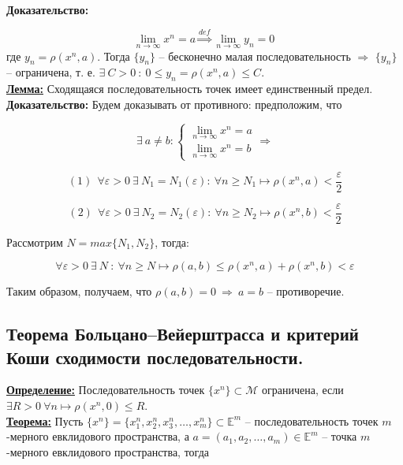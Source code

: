 \documentclass[a4paper,12pt]{article} %
\begin{document}
	\textbf{Доказательство:}
	
	\[ \lim\limits_{n \to \infty} x^n = a \stackrel{def}{\Rightarrow} \lim\limits_{n \to \infty} y_n = 0 \
	\]
	\noindent где $y_n = \rho(x^n, a)$. Тогда $\{y_n \}$ -- бесконечно малая последовательность $\Rightarrow$ $\{y_n \}$ -- ограничена, т. е. $\exists ~ C > 0 ~ : ~ 0 \leqslant y_n = \rho(x^n, a) \leqslant C$.\\
	
	\underline{\textbf{Лемма:}} Сходящаяся последовательность точек имеет единственный предел.\\
	
	\textbf{Доказательство:} Будем доказывать от противного: предположим, что
	
	\begin{equation*}
		\exists ~ a \neq b : 
		\begin{cases}
			\lim\limits_{n \to \infty} x^n = a\\
			\lim\limits_{n \to \infty} x^n = b
		\end{cases}
		\Rightarrow
	\end{equation*}
	
	\[ (1) ~~ \forall \varepsilon > 0 ~ \exists ~ N_1 = N_1(\varepsilon) : ~ \forall n \geqslant N_1 \mapsto \rho(x^n, a) < \frac{\varepsilon}{2} \]
	
	\[ (2) ~~ \forall \varepsilon > 0 ~ \exists ~ N_2 = N_2(\varepsilon) : ~ \forall n \geqslant N_2 \mapsto \rho(x^n, b) < \frac{\varepsilon}{2} \]
	
	Рассмотрим $N = max \{N_1, N_2\}$, тогда:
	
	\[ \forall \varepsilon > 0 ~ \exists ~ N ~ : ~ \forall n \geqslant N \mapsto \rho(a, b) \leqslant \rho(x^n, a) + \rho(x^n, b) < \varepsilon \]
	
	Таким образом, получаем, что $\rho(a, b) = 0 ~ \Rightarrow ~ a = b$ -- противоречие.\\
	
	\subsection{Теорема Больцано–Вейерштрасса и критерий Коши сходимости последовательности.}
	
	\underline{\textbf{Определение:}} Последовательность точек $\{x^n \} \subset \mathscr{M}$ ограничена, если $\exists R > 0 ~ \forall n \mapsto \rho(x^n, 0) \leqslant R$.\\
	
	\underline{\textbf{Теорема:}} Пусть $\{x^n \} = \{x_1^n, x_2^n, x_3^n, \dots, x_m^n\} \subset \mathbb{E}^m$ -- последовательность точек $m$-мерного евклидового пространства, а $a = (a_1, a_2, \dots, a_m) \in \mathbb{E}^m$ -- точка $m$-мерного евклидового пространства, тогда
	
\end{document}
